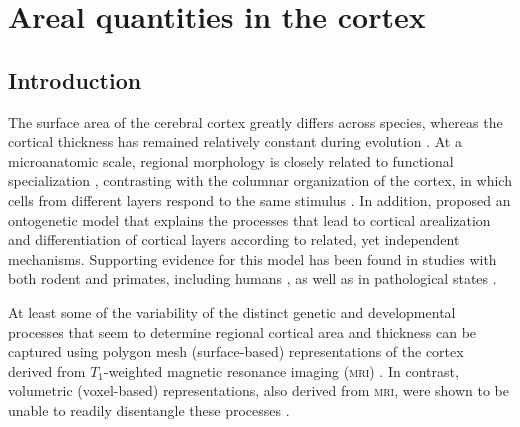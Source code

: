 \chapter{Areal quantities in the cortex}
\label{sec:areal}
\setstretch{\lspac}

\section{Introduction}

The surface area of the cerebral cortex greatly differs across species, whereas the cortical thickness has remained relatively constant during evolution \citep{Mountcastle1998, Fish2008}. At a microanatomic scale, regional morphology is closely related to functional specialization \citep{Roland1998, Zilles2010}, contrasting with the columnar organization of the cortex, in which cells from different layers respond to the same stimulus \citep{EGJones2000, Buxhoeveden2002}. In addition, \citet{Rakic1988} proposed an ontogenetic model that explains the processes that lead to cortical arealization and differentiation of cortical layers according to related, yet independent mechanisms. Supporting evidence for this model has been found in studies with both rodent and primates, including humans \citep{Chenn2002, Rakic2009}, as well as in pathological states \citep{Rimol2010b, Bilguvar2010}.

At least some of the variability of the distinct genetic and developmental processes that seem to determine regional cortical area and thickness can be captured using polygon mesh (surface-based) representations of the cortex derived from $T_1$-weighted magnetic resonance imaging (\textsc{mri}) \citep{Panizzon2009, Winkler2010, SanabriaDiaz2010}. In contrast, volumetric (voxel-based) representations, also derived from \textsc{mri}, were shown to be unable to readily disentangle these processes \citep{Winkler2010}.

